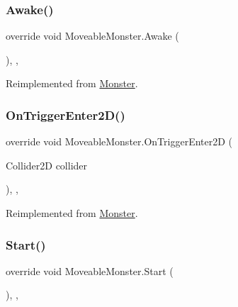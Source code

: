 \subsubsection{\texorpdfstring{Awake()}{Awake()}}
{\footnotesize\ttfamily override void Moveable\+Monster.\+Awake (\begin{DoxyParamCaption}{ }\end{DoxyParamCaption})\hspace{0.3cm}{\ttfamily [inline]}, {\ttfamily [protected]}, {\ttfamily [virtual]}}



Reimplemented from \mbox{\hyperlink{class_monster_a3ccbdc33e8e7e6fb20286338ad17c6f2}{Monster}}.

\mbox{\label{class_moveable_monster_a07aefb0242f24f5b0f2b4cd820b31522}} 
\subsubsection{\texorpdfstring{On\+Trigger\+Enter2\+D()}{OnTriggerEnter2D()}}
{\footnotesize\ttfamily override void Moveable\+Monster.\+On\+Trigger\+Enter2D (\begin{DoxyParamCaption}\item[{Collider2D}]{collider }\end{DoxyParamCaption})\hspace{0.3cm}{\ttfamily [inline]}, {\ttfamily [protected]}, {\ttfamily [virtual]}}



Reimplemented from \mbox{\hyperlink{class_monster_af6ac6a4c01088e6b4abf79da772cecff}{Monster}}.

\mbox{\label{class_moveable_monster_a898a6098d4dd0226084e36f3a1c7f093}} 
\subsubsection{\texorpdfstring{Start()}{Start()}}
{\footnotesize\ttfamily override void Moveable\+Monster.\+Start (\begin{DoxyParamCaption}{ }\end{DoxyParamCaption})\hspace{0.3cm}{\ttfamily [inline]}, {\ttfamily [protected]}, {\ttfamily [virtual]}}



